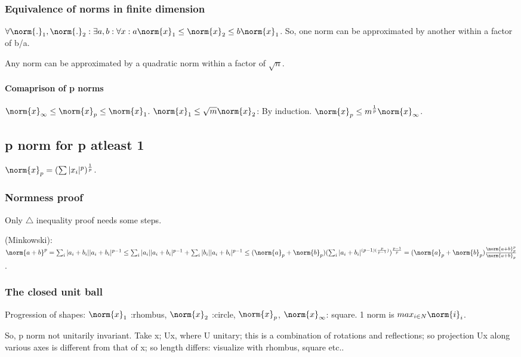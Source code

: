 \documentclass[oneside, article]{memoir}
\begin{document}
\subsubsection{Equivalence of norms in finite dimension}
$\forall \norm{.}_1, \norm{.}_2: \exists a, b: \forall x: a\norm{x}_1 \leq \norm{x}_2 \leq b\norm{x}_1 $. \why So, one norm can be approximated by another within a factor of b/a.

Any norm can be approximated by a quadratic norm within a factor of $\sqrt{n}$.

\paragraph*{Comaprison of p norms}
$\norm{x}_{\infty} \leq \norm{x}_{p} \leq \norm{x}_{1}$. $\norm{x}_{1}\leq \sqrt{m}\norm{x}_{2}$: By induction. $\norm{x}_{p} \leq m^{\frac{1}{p}}\norm{x}_{\infty}$.

\subsection{p norm for p atleast 1}
$\norm{x}_{p} = (\sum |x_{i}|^{p})^{\frac{1}{p}}$.

\subsubsection{Normness proof}
Only $\triangle$ inequality proof needs some steps.

(Minkowski): $\norm{a + b}^{p} = \sum_{i} |a_{i} + b_{i}||a_{i} + b_{i}|^{p-1} \leq \sum_{i} |a_{i}||a_{i} + b_{i}|^{p-1} + \sum_{i} |b_{i}||a_{i} + b_{i}|^{p-1} \\
\leq (\norm{a}_{p} + \norm{b}_{p})(\sum_{i}|a_{i} + b_{i}|^{(p-1)(\frac{p}{p-1})})^{\frac{p-1}{p}} = (\norm{a}_{p} + \norm{b}_{p})\frac{\norm{a + b}_p^{p}}{\norm{a + b}_p}$.

\subsubsection{The closed unit ball}
Progression of shapes: $\norm{x}_{1}$ :rhombus, $\norm{x}_{2}$ :circle, $\norm{x}_{p}$, $\norm{x}_{\infty}$: square. 1 norm is $max_{i \in N} \norm{i}_{i}$.

So, p norm not unitarily invariant. Take x; Ux, where U unitary; this is a combination of rotations and reflections; so projection Ux along various axes is different from that of x; so length differs: visualize with rhombus, square etc..
\end{document}
